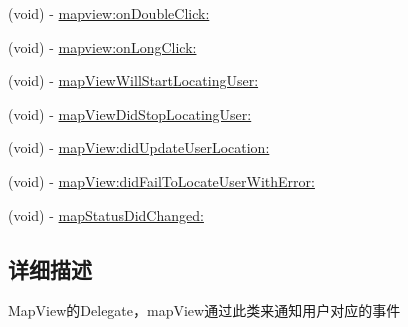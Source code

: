 \begin{DoxyCompactItemize}
\item 
(void) -\/ \hyperlink{protocol_b_m_k_map_view_delegate-p_a957fb04d2fb88bd0e45ad9d712c1e85f}{mapview\-:on\-Double\-Click\-:}
\item 
(void) -\/ \hyperlink{protocol_b_m_k_map_view_delegate-p_abdef3e78c6a4d51665bc859e16c629a4}{mapview\-:on\-Long\-Click\-:}
\item 
(void) -\/ \hyperlink{protocol_b_m_k_map_view_delegate-p_a2265718129af225330d0d5f350f45dd2}{map\-View\-Will\-Start\-Locating\-User\-:}
\item 
(void) -\/ \hyperlink{protocol_b_m_k_map_view_delegate-p_aac6507cc2dea1a2a7c2df80d08b42102}{map\-View\-Did\-Stop\-Locating\-User\-:}
\item 
(void) -\/ \hyperlink{protocol_b_m_k_map_view_delegate-p_a85fe7a69fc1924412e6a97d259157ab3}{map\-View\-:did\-Update\-User\-Location\-:}
\item 
(void) -\/ \hyperlink{protocol_b_m_k_map_view_delegate-p_a09254d3d99fa4c5777c646725b029966}{map\-View\-:did\-Fail\-To\-Locate\-User\-With\-Error\-:}
\item 
(void) -\/ \hyperlink{protocol_b_m_k_map_view_delegate-p_a06d810eed5ca8add043ab4cd9367f14f}{map\-Status\-Did\-Changed\-:}
\end{DoxyCompactItemize}


\subsection{详细描述}
Map\-View的\-Delegate，map\-View通过此类来通知用户对应的事件 

